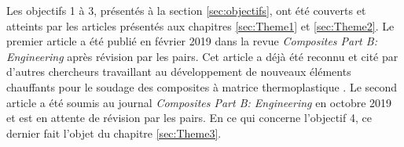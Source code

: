 Les objectifs 1 à 3, présentés à la section \ref{sec:objectifs}, ont été couverts et atteints par les articles présentés aux chapitres \ref{sec:Theme1} et \ref{sec:Theme2}. 
Le premier article \cite{Brassard2019a} a été publié en février 2019 dans la revue \textit{Composites Part B: Engineering} après révision par les pairs. 
Cet article a déjà été reconnu et cité par d'autres chercheurs travaillant au développement de nouveaux éléments chauffants pour le soudage des composites à matrice thermoplastique \cite{Russello2019,Su2020,Bhudolia2020,Bhudolia2020a}. 
Le second article a été soumis au journal \textit{Composites Part B: Engineering} en octobre 2019 et est en attente de révision par les pairs. 
En ce qui concerne l'objectif 4, ce dernier fait l'objet du chapitre \ref{sec:Theme3}. 